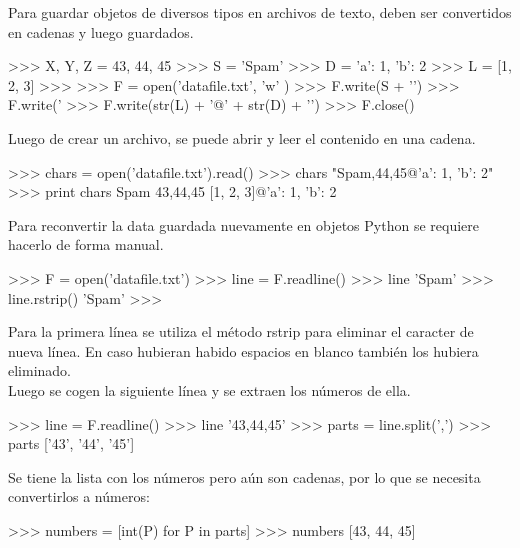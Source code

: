 Para guardar objetos de diversos tipos en archivos de texto, deben ser convertidos en cadenas y luego guardados.\\

\begin{pyglist} [language=python]
>>> X, Y, Z = 43, 44, 45 
>>> S = 'Spam' 
>>> D = {'a': 1, 'b': 2} 
>>> L = [1, 2, 3] 
>>> 
>>> F = open('datafile.txt', 'w' )
>>> F.write(S + '\n') 
>>> F.write('%
>>> F.write(str(L) + '@' + str(D) + '\n') 
>>> F.close()
\end{pyglist}

Luego de crear un archivo, se puede abrir y leer el contenido en una cadena.\\

\begin{pyglist} [language=python]
>>> chars = open('datafile.txt').read()
>>> chars
"Spam,44,45\n[1, 2, 3]@{'a': 1, 'b': 2}\n"
>>> print chars
Spam
43,44,45
[1, 2, 3]@{'a': 1, 'b': 2}
\end{pyglist}

Para reconvertir la data guardada nuevamente en objetos Python se requiere hacerlo de forma manual.\\

\begin{pyglist} [language=python]
>>> F = open('datafile.txt')
>>> line = F.readline()
>>> line
'Spam\n'
>>> line.rstrip()
'Spam'
>>> 
\end{pyglist}

Para la primera línea se utiliza el método rstrip para eliminar el caracter de nueva línea. En caso hubieran habido espacios en blanco también los hubiera eliminado.\\

Luego se cogen la siguiente línea y se extraen los números de ella.\\

\begin{pyglist} [language=python]
>>> line = F.readline()
>>> line
'43,44,45\n'
>>> parts = line.split(',')
>>> parts
['43', '44', '45\n']
\end{pyglist}

Se tiene la lista con los números pero aún son cadenas, por lo que se necesita convertirlos a números:\\

\begin{pyglist} [language=python]
>>> numbers = [int(P) for P in parts]
>>> numbers
[43, 44, 45]
\end{pyglist}

